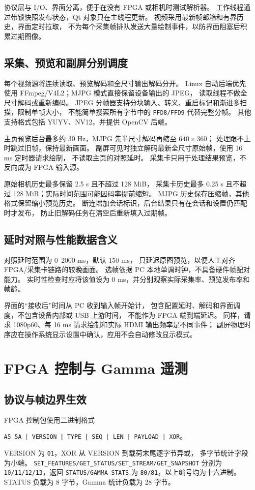 协议层与 I/O、界面分离，便于在没有 FPGA 或相机时测试解析器。
工作线程通过带锁快照发布状态，Qt 对象只在主线程更新。
视频采用最新帧邮箱和有界历史，界面定时拉取，
不为每个采集帧排队发送大量绘制事件，以防界面阻塞后积累过期图像。

\subsection{采集、预览和副屏分别调度}
每个视频源将连续读取、预览解码和全尺寸输出解码分开。
Linux 自动后端优先使用 FFmpeg/V4L2；MJPG 模式直接保留设备输出的 JPEG，
读取线程不做全尺寸解码或重新编码。
JPEG 分帧器支持分块输入、转义、重启标记和渐进多扫描，限制单帧大小，
不能简单搜索所有字节中的 \texttt{FFD8/FFD9} 代替完整分帧。
其他支持格式包括 YUYV、NV12，并提供 OpenCV 后端。

主页预览后台最多约 30 Hz，MJPG 先半尺寸解码再缩至 $640\times360$；
处理跟不上时跳过旧帧，保持最新画面。
副屏可见时独立解码最新全尺寸原始帧，使用 16 ms 定时器请求绘制，
不读取主页的对照延时。
采集卡只用于处理结果预览，不反向成为 FPGA 输入源。

原始相机历史最多保留 2.5 s 且不超过 128 MiB，
采集卡历史最多 0.25 s 且不超过 128 MiB；实际时间范围可能因码率提前缩短。
MJPG 历史保存压缩帧，其他格式保留缩小预览历史。
断连增加会话标识，后台结果只有在会话和设置仍匹配时才发布，
防止旧解码任务在清空后重新填入过期帧。

\subsection{延时对照与性能数据含义}
对照延时范围为 0--2000 ms，默认 150 ms，
只延迟原图预览，以便人工对齐 FPGA/采集卡链路的较晚画面。
选帧依据 PC 本地单调时钟，不具备硬件帧配对能力。
实时性检查时应将该值设为 0 ms，并分别观察实际采集率、预览发布率和帧龄。

界面的“接收后”时间从 PC 收到输入帧开始计，
包含配置延时、解码和界面调度，不包含设备内部或 USB 上游时间，
不能作为 FPGA 端到端延迟。
同样，请求 1080p60、每 16 ms 请求绘制和实际 HDMI 输出频率是不同事件；
副屏物理时序应在操作系统显示设置中确认，应用不会自动修改显示模式。

\section{FPGA 控制与 Gamma 遥测}
\subsection{协议与帧边界生效}
FPGA 控制包使用二进制格式
\begin{center}\small
\texttt{A5 5A | VERSION | TYPE | SEQ | LEN | PAYLOAD | XOR}。
\end{center}
VERSION 为 \texttt{01}，XOR 从 VERSION 到载荷末尾逐字节异或，
多字节统计字段为小端。
\texttt{SET\_FEATURES/GET\_STATUS/SET\_STREAM/GET\_SNAPSHOT}
分别为 \texttt{10/11/12/13}，返回
\texttt{STATUS/GAMMA\_STATS} 为 \texttt{80/81}，以上编号均为十六进制。
STATUS 负载为 8 字节，Gamma 统计负载为 28 字节。

